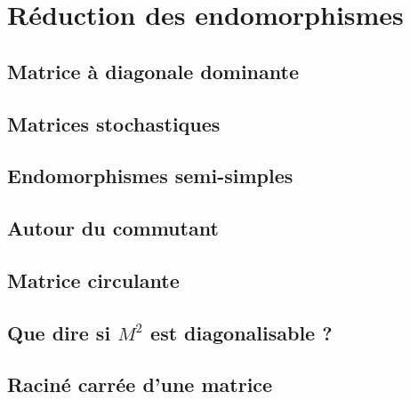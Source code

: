 \chapter{Réduction des endomorphismes}



\newpage

\section{Matrice à diagonale dominante}


\section{Matrices stochastiques}


\section{Endomorphismes semi-simples}


\section{Autour du commutant}


\section{Matrice circulante} %


\section{Que dire si \texorpdfstring{$M^2$}{M^2} est diagonalisable ?}


\section{Raciné carrée d'une matrice}


